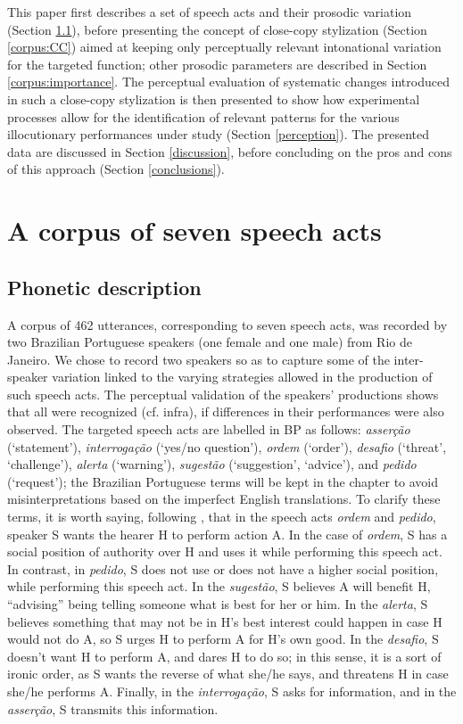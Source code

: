 \documentclass[output=paper]{LSP/langsci}
\begin{document}
This paper first describes a set of speech acts and their prosodic variation (Section \ref{corpus:phonetic}), before presenting the concept of close-copy stylization (Section \ref{corpus:CC}) aimed at keeping only perceptually relevant intonational variation for the targeted function; other prosodic parameters are described in Section \ref{corpus:importance}. The perceptual evaluation of  systematic changes introduced in such a close-copy stylization is then presented to show how experimental processes allow for the identification of relevant patterns for the various illocutionary performances under study (Section \ref{perception}). The presented data are discussed in Section \ref{discussion}, before concluding on the pros and cons of this approach (Section \ref{conclusions}).


\section{A corpus of seven speech acts}
\label{corpus}
\subsection{Phonetic description}
\label{corpus:phonetic}

A corpus of 462 utterances, corresponding to seven speech acts, was recorded by two Brazilian Portuguese speakers (one female and one male) from Rio de Janeiro. 
We chose to record two speakers so as to capture some of the inter-speaker variation linked to the varying strategies allowed in the production of such speech acts. 
The perceptual validation of the speakers' productions shows that all were recognized (cf. infra), if differences in their performances were also observed.
The targeted speech acts are labelled in BP as follows: \textit{asserção} (`statement'), \textit{interrogação} (`yes/no question'), \textit{ordem} (`order'), \textit{desafio} (`threat', `challenge'), \textit{alerta} (`warning'), \textit{sugestão} (`suggestion', `advice'), and \textit{pedido} (`request'); the Brazilian Portuguese terms will be kept in the chapter to avoid misinterpretations based on the imperfect English translations. 
To clarify these terms, it is worth saying, following \citet{Searle1979}, that in the speech acts \textit{ordem} and \textit{pedido}, speaker S wants the hearer H to perform action A. 
In the case of \textit{ordem}, S has a social position of authority over H and uses it while performing this speech act. 
In contrast, in \textit{pedido}, S does not use or does not have a higher social position, while performing this speech act. 
In the \textit{sugestão}, S believes A will benefit H, ``advising'' being telling someone what is best for her or him. 
In the \textit{alerta}, S believes something that may not be in H's best interest could happen in case H would not do A, so S urges H to perform A for H's own good.
In the \textit{desafio}, S doesn't want H to perform A, and dares H to do so; in this sense, it is a sort of ironic order, as S wants the reverse of what she/he says, and threatens H in case she/he performs A. 
Finally, in the \textit{interrogação}, S asks for information, and in the \textit{asserção}, S transmits this information.
\end{document}
